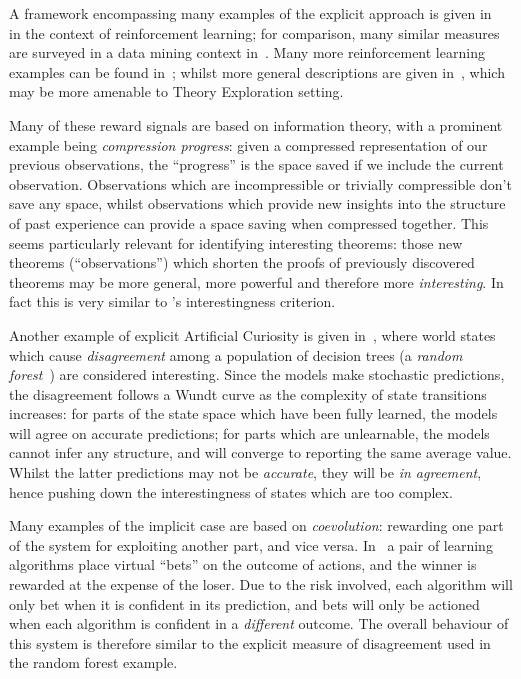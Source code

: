 {A framework encompassing many examples of the explicit approach is given
in~\cite{oudeyer2007intrinsic} in the context of reinforcement learning; for
comparison, many similar measures are surveyed in a data mining context
in~\cite{geng2006interestingness}. Many more reinforcement learning examples can
be found in~\cite{Kaplan2006, Lipson2007, Luciw2011, Macedo2000,
  Ramik.Sabourin.Madani:2013, Roa.Kruijff.Jacobsson:2009, Schmidhuber:1991,
  oudeyer2004intelligent}; whilst more general descriptions are given
in~\cite{Schaul.Sun.Wierstra.ea:2011, Scott1989, maher2008achieving}, which may
be more amenable to Theory Exploration setting.

Many of these reward signals are based on information theory, with a prominent
example being \emph{compression progress}: given a compressed representation of
our previous observations, the ``progress'' is the space saved if we include the
current observation. Observations which are incompressible or trivially
compressible don't save any space, whilst observations which provide new
insights into the structure of past experience can provide a space saving when
compressed together. This seems particularly relevant for identifying
interesting theorems: those new theorems (``observations'') which shorten the
proofs of previously discovered theorems may be more general, more powerful and
therefore more \emph{interesting}. In fact this is very similar to
\quickspec{}'s interestingness criterion.

Another example of explicit Artificial Curiosity is given
in~\cite{Hester.Stone:2012}, where world states which cause \emph{disagreement}
among a population of decision trees (a \emph{random
  forest}~\cite{randomforests}) are considered interesting. Since the models
make stochastic predictions, the disagreement follows a Wundt curve as the
complexity of state transitions increases: for parts of the state space which
have been fully learned, the models will agree on accurate predictions; for
parts which are unlearnable, the models cannot infer any structure, and will
converge to reporting the same average value. Whilst the latter predictions may
not be \emph{accurate}, they will be \emph{in agreement}, hence pushing down the
interestingness of states which are too complex.

Many examples of the implicit case are based on \emph{coevolution}: rewarding
one part of the system for exploiting another part, and vice versa. In~\cite{Schmidhuber1999} a pair of learning algorithms place virtual ``bets''
on the outcome of actions, and the winner is rewarded at the expense of the
loser. Due to the risk involved, each algorithm will only bet when it is
confident in its prediction, and bets will only be actioned when each algorithm
is confident in a \emph{different} outcome. The overall behaviour of this system
is therefore similar to the explicit measure of disagreement used in the random
forest example.

}
